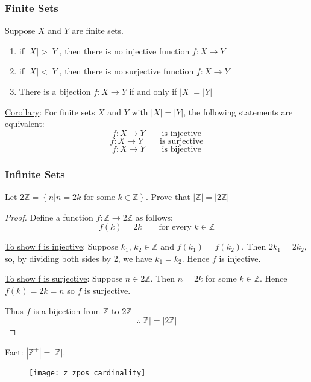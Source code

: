 \subsubsection{Finite Sets}
\begin{theorm}
    Suppose $X$ and $Y$ are finite sets.
    \begin{enumerate}
        \item if $|X|>|Y|$, then there is no injective function $f:X\rightarrow Y$
        \item if $|X|<|Y|$, then there is no surjective function $f:X\rightarrow Y$
        \item There is a bijection $f:X\rightarrow Y$ if and only if $|X|=|Y|$
    \end{enumerate}

    \underline{Corollary}: For finite sets $X$ and $Y$ with $|X|=|Y|$, the following statements are equivalent:
    $$f:X\rightarrow Y \qquad\text{is injective}$$
    $$f:X\rightarrow Y \qquad\text{is surjective}$$
    $$f:X\rightarrow Y \qquad\text{is bijective}$$
\end{theorm}

\subsubsection{Infinite Sets}
Let $2\mathbb Z = \left\{n | n = 2k\text{ for some }k\in\mathbb Z\right\}$. Prove that $|\mathbb Z| = |2\mathbb Z|$

\begin{proof}
    Define a function $f:\mathbb Z \rightarrow 2\mathbb Z$ as follows: $$f(k) = 2k \qquad\text{for every $k\in\mathbb Z$}$$

    \underline{To show f is injective}:
    Suppose $k_1,\,k_2\in\mathbb Z$ and $f(k_1) = f(k_2)$. Then $2k_1 = 2k_2$, so, by dividing both sides by 2, we have $k_1 = k_2$. Hence $f$ is injective.

    \underline{To show f is surjective}:
    Suppose $n\in 2\mathbb Z$. Then $n=2k$ for some $k\in\mathbb Z$. Hence $f(k) = 2k = n$ so $f$ is surjective.

    Thus $f$ is a bijection from $\mathbb Z$ to $2\mathbb Z$ $$\therefore |\mathbb Z| = |2\mathbb Z|$$
\end{proof}

Fact: $|\mathbb Z^+| = |\mathbb Z|$.

\begin{figure}[H]
    \centering
    \texttt{[image: z\_zpos\_cardinality]}
\end{figure}

